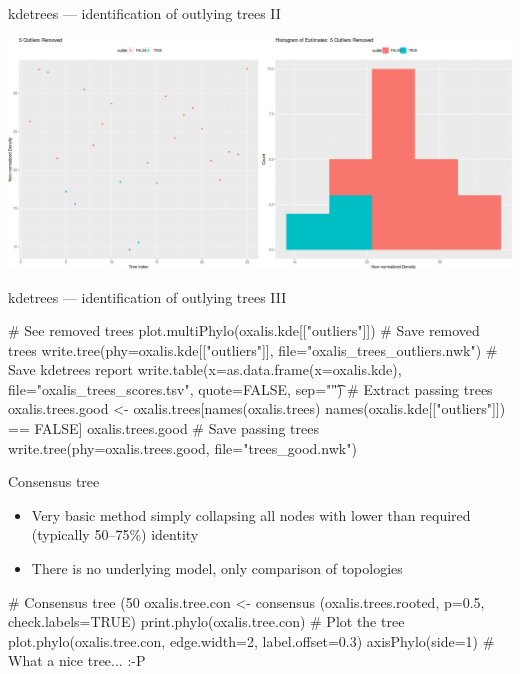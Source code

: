 \documentclass[compress, xelatex, 11pt, xcolor=svgnames, aspectratio=169,
	hyperref={
		bookmarks=true,
		unicode=true,
		colorlinks=true,
		pdftitle={Molecular data in R},
		plainpages=false,
		pdfauthor={Vojtech Zeisek},
		pdfsubject={Course about phylogeny and evolution in R},
		pdfcreator={XeLaTeX},
		pdfkeywords={R, evolution, phylogeny, molecular data},
		linkcolor=Crimson, %
		anchorcolor=Magenta, %
		citecolor=Magenta, %
		filecolor=Magenta, %
		menucolor=Magenta, %
		urlcolor=DodgerBlue, %
		},
	url={hyphens, lowtilde} %
	]{beamer}
\renewcommand{\texttt}[1]{\colorbox{Beige}{{\ttfamily #1}}}
\begin{document}
\begin{frame}{kdetrees --- identification of outlying trees II}
	\begin{center}
		\includegraphics[width=\textwidth-1cm]{kdetrees.png}
	\end{center}
\end{frame}

\begin{frame}[fragile]{kdetrees --- identification of outlying trees III}
	\begin{spluscode}
    # See removed trees
    plot.multiPhylo(oxalis.kde[["outliers"]])
    # Save removed trees
    write.tree(phy=oxalis.kde[["outliers"]], file="oxalis_trees_outliers.nwk")
    # Save kdetrees report
    write.table(x=as.data.frame(x=oxalis.kde), file="oxalis_trees_scores.tsv",
      quote=FALSE, sep="\t")
    # Extract passing trees
    oxalis.trees.good <- oxalis.trees[names(oxalis.trees) %
      names(oxalis.kde[["outliers"]]) == FALSE]
    oxalis.trees.good
    # Save passing trees
    write.tree(phy=oxalis.trees.good, file="trees_good.nwk")
	\end{spluscode}
\end{frame}

\begin{frame}[fragile]{Consensus tree}
	\begin{multicols}{2}
		\begin{center}
			\texttt{[image: oxalis-cons.png]}
		\end{center}
		\begin{itemize}
		 \item Very basic method simply collapsing all nodes with lower than required (typically 50--75\%) identity
		 \item There is no underlying model, only comparison of topologies
		\end{itemize}
		\begin{spluscode}
    # Consensus tree (50%
    oxalis.tree.con <- consensus
      (oxalis.trees.rooted, p=0.5,
      check.labels=TRUE)
    print.phylo(oxalis.tree.con)
    # Plot the tree
    plot.phylo(oxalis.tree.con,
      edge.width=2, label.offset=0.3)
    axisPhylo(side=1)
    # What a nice tree... :-P
		\end{spluscode}
	\end{multicols}
\end{frame}
\end{document}
